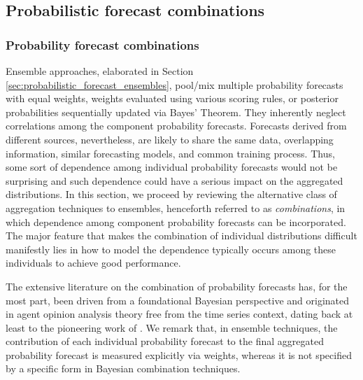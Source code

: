 \documentclass[11pt]{article}
\begin{document}
\subsection{Probabilistic forecast combinations}
\label{sec:probabilistic_forecast_combinations}

\subsubsection{Probability forecast combinations}
\label{sec:probability_forecast_combinations}


Ensemble approaches, elaborated in Section \ref{sec:probabilistic_forecast_ensembles}, pool/mix multiple probability forecasts with equal weights, weights evaluated using various scoring rules, or posterior probabilities sequentially updated via Bayes' Theorem. They inherently neglect correlations among the component probability forecasts. Forecasts derived from different sources, nevertheless, are likely to share the same data, overlapping information, similar forecasting models, and common training process. Thus, some sort of dependence among individual probability forecasts would not be surprising and such dependence could have a serious impact on the aggregated distributions. In this section, we proceed by reviewing the alternative class of aggregation techniques to ensembles, henceforth referred to as \textit{combinations}, in which dependence among component probability forecasts can be incorporated. The major feature that makes the combination of individual distributions difficult manifestly lies in how to model the dependence typically occurs among these individuals to achieve good performance.

The extensive literature on the combination of probability forecasts has, for the most part, been driven from a foundational Bayesian perspective and originated in agent opinion analysis theory free from the time series context, dating back at least to the pioneering work of \cite{Winkler1968-uw}. We remark that, in ensemble techniques, the contribution of each individual probability forecast to the final aggregated probability forecast is measured explicitly via weights, whereas it is not specified by a specific form in Bayesian combination techniques.
\end{document}
